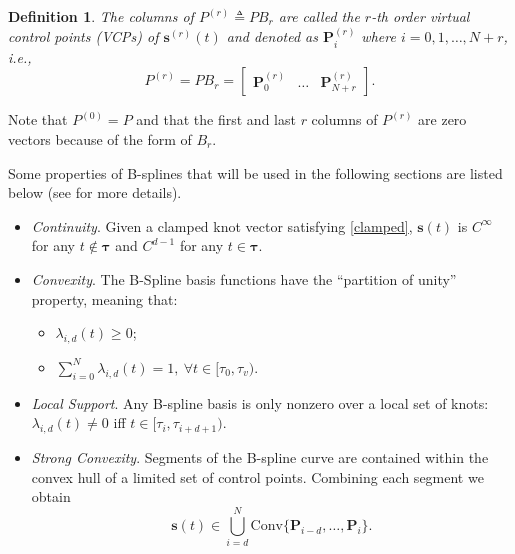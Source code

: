 \documentclass[journal,10pt]{IEEEtran}
\newtheorem{definition}{\bfseries Definition}%
\newcommand{\vect}[1]{\boldsymbol{\mathbf{#1}}}
\newcommand{\mat}[1]{\begin{bmatrix} #1 \end{bmatrix}}
\newif\ifdraft
\newcommand{\XX}[1]{\ifdraft{\color{red}[{\bf XX}: #1]}\fi}
\begin{document}
\begin{definition}\label{virtual_control_points_old} The columns of $P^{(r)} \triangleq PB_{r}$ are called the \emph{$r$-th order virtual control points} (VCPs) of $\vect{s}^{(r)}(t)$ and denoted as $\vect{P}_i^{(r)}$ where $i=0,1,\ldots,N+r$, i.e., 
\begin{equation}\label{virtual_cp_eq}
    P^{(r)} = PB_{r} = \mat{\vect{P}_0^{(r)} & \dots & \vect{P}_{N+r}^{(r)}}.
\end{equation}
\end{definition}
Note that $P^{(0)} = P$ and that the first and last $r$ columns of $P^{(r)}$ are zero vectors because of the form of $B_{r}$. 

Some properties of B-splines that will be used in the following sections are listed below (see \cite{deboor,fajar_thesis} for more details). 
\begin{itemize}
    \item[P1)] \textit{Continuity}. Given a clamped knot vector satisfying \eqref{clamped},  $\vect{s}(t)$ is $C^{\infty}$ for any  $t\notin \vect{\tau}$ and $C^{d-1}$ for any $t\in\vect{\tau}$.
    \item[P2)] \textit{Convexity}. The B-Spline basis functions have the ``partition of unity'' property, meaning that: 
    \begin{itemize}
        \item[(i)] $\lambda_{i,d}(t) \geq 0$;
        \item[(ii)] $\sum_{i=0}^{N}\lambda_{i,d}(t)= 1, \ \forall t\in[\tau_0,\tau_v)$.
    \end{itemize}
    \item[P3)] \textit{Local Support}. Any B-spline basis is only nonzero over a local set of knots: $\lambda_{i,d}(t)\neq 0$ iff $t\in[\tau_i,\tau_{i+d+1})$.
    \item[P4)] \textit{Strong Convexity}. Segments of the B-spline curve are contained within the convex hull of a limited set of control points. Combining each segment we obtain 
    \begin{equation*}
        \vect{s}(t) \in \bigcup_{i=d}^{N}\text{Conv}\{\vect{P}_{i-d},\dots,\vect{P}_i\}.
    \end{equation*}
\end{itemize} 
\end{document}
